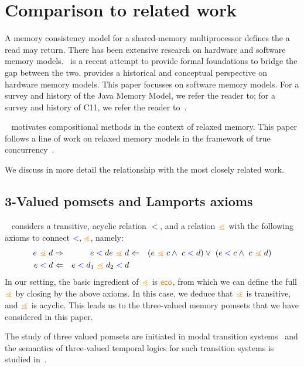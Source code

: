\section{Comparison to related work}\label{sec:ldrf}
A memory consistency model for a shared-memory multiprocessor defines the a read may return.  There has been extensive research on hardware and software memory models.~\citet{DBLP:journals/pacmpl/PodkopaevLV19} is a recent attempt to provide formal foundations to bridge the gap between the two.  \citet{AlglaveThesis} provides a historical and conceptual perspective on hardware memory models.  This paper focusses on software memory models.   For a survey and history of the Java Memory Model, we refer the reader to\citet{DBLP:journals/toplas/Lochbihler13}; for a survey and history of C11, we refer the reader to~\citet{DBLP:phd/ethos/Batty15}.  

~\citet{Batty17} motivates compositional methods in the context of relaxed memory.  This paper follows a line of work on relaxed memory models in the framework of true concurrency~\cite{DBLP:conf/lics/JeffreyR16,Pichon-Pharabod:2016:CSR:2837614.2837616,DBLP:conf/esop/CenciarelliKS07}.  

We discuss in more detail the relationship with the most closely related work.  

\subsection{3-Valued pomsets and Lamports axioms}
~\citet{DBLP:journals/dc/Lamport86} considers a transitive, acyclic relation $\lt$, and a relation $\gtN$ with the following axioms to connect $\lt,\gtN$, namely:
\begin{align*}
\aEv \gtN \bEv & \Rightarrow & \aEv \lt \bEv
\aEv \gtN \bEv &\Leftarrow& (\aEv \gtN \cEv \wedge\ \cEv \lt \bEv) \vee\ (\aEv \lt \cEv \wedge\ \cEv \gtN \bEv) \\
\aEv \lt \bEv &\Leftarrow& \aEv \lt \bEv_1 \gtN \bEv_2 \lt \bEv 
\end{align*}
In our setting, the basic ingredient of $\gtN$ is $\reco$, from which we can define the full $\gtN$ by closing by the above axioms. In this case, we deduce  that $\gtN$ is transitive, and $\gtN$ is acyclic.   This leads us to the three-valued  memory pomsets that we have considered in this paper. 

The study of three valued pomsets are initiated in modal transition systems~\citep{DBLP:conf/lics/LarsenT88, DBLP:conf/avmfss/Larsen89,DBLP:conf/avmfss/Larsen89} and the semantics of  three-valued temporal logics for such transition systems is studied in~\citep{DBLP:conf/concur/BrunsG00,DBLP:conf/esop/HuthJS01}. 

